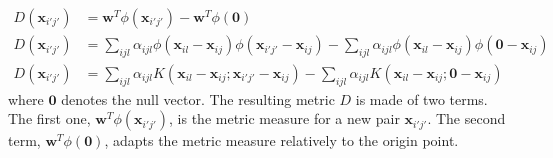 \begin{align}
	D(\textbf{x}_{i'j'}) & = \textbf{w}^T \phi(\textbf{x}_{i'j'}) - \textbf{w}^T \phi(\textbf{0})\\
	D(\textbf{x}_{i'j'}) &= \sum\limits_{ijl} \alpha_{ijl} 
	\phi(
	\textbf{x}_{il}-\textbf{x}_{ij}
	)
	\phi(	
	\textbf{x}_{i'j'}-\textbf{x}_{ij}
	) 
	-
	\sum\limits_{ijl} \alpha_{ijl} 
	\phi(
	\textbf{x}_{il}-\textbf{x}_{ij}
	)
	\phi(	
	\textbf{0}-\textbf{x}_{ij}
	) 				
	\\
	D(\textbf{x}_{i'j'}) &= \sum\limits_{ijl} \alpha_{ijl} 
	K
	\left( 
	\textbf{x}_{il}-\textbf{x}_{ij}
	;	
	\textbf{x}_{i'j'}-\textbf{x}_{ij}
	\right) 		
	-
	\sum\limits_{ijl} \alpha_{ijl} 
	K
	\left( 
	\textbf{x}_{il}-\textbf{x}_{ij}
	;	
	\textbf{0}-\textbf{x}_{ij}
	\right) 		
	\label{Eq:nonlinearD}		
\end{align}
\noindent where $\textbf{0}$ denotes the null vector. The resulting metric $D$ is made of two terms. The first one, $\textbf{w}^T \phi(\textbf{x}_{i'j'})$, is the metric measure for a new pair $\textbf{x}_{i'j'}$. The second term, $\textbf{w}^T \phi(\textbf{0})$, adapts the metric measure relatively to the origin point. 

